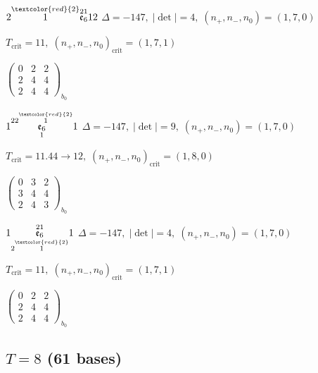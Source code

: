 \documentclass[10pt]{article}
\begin{document}
\smallskip

$2\overset{\textcolor{red}{2}}{1}\overset{21}{\mathfrak{e}_6}12$ \quad $\Delta=-147,\; |\det|=4,\; (n_+,n_-,n_0)=(1,7,0)$

\hspace{1em}$T_{\text{crit}}=11,\; (n_+,n_-,n_0)_{\text{crit}}=(1,7,1)$

\hspace{2em}$\left(\begin{smallmatrix}0 & 2 & 2 \\ 2 & 4 & 4 \\ 2 & 4 & 4\end{smallmatrix}\right)_{\!b_0}$

\smallskip

$1\overset{22\overset{\textcolor{red}{2}}{1}}{\underset{1}{\mathfrak{e}_6}}1$ \quad $\Delta=-147,\; |\det|=9,\; (n_+,n_-,n_0)=(1,7,0)$

\hspace{1em}$T_{\text{crit}}=11.44 \to 12,\; (n_+,n_-,n_0)_{\text{crit}}=(1,8,0)$

\hspace{2em}$\left(\begin{smallmatrix}0 & 3 & 2 \\ 3 & 4 & 4 \\ 2 & 4 & 3\end{smallmatrix}\right)_{\!b_0}$

\smallskip

$1\overset{21}{\underset{2\overset{\textcolor{red}{2}}{1}}{\mathfrak{e}_6}}1$ \quad $\Delta=-147,\; |\det|=4,\; (n_+,n_-,n_0)=(1,7,0)$

\hspace{1em}$T_{\text{crit}}=11,\; (n_+,n_-,n_0)_{\text{crit}}=(1,7,1)$

\hspace{2em}$\left(\begin{smallmatrix}0 & 2 & 2 \\ 2 & 4 & 4 \\ 2 & 4 & 4\end{smallmatrix}\right)_{\!b_0}$


\subsection*{$T = 8$ \quad (61 bases)}
\smallskip
\end{document}
